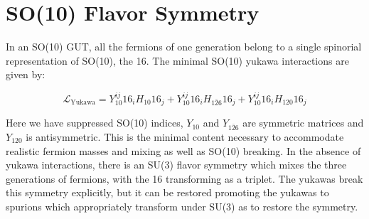 \documentclass[aps,onecolumn,twoside,secnumarabic,balancelastpage,amsmath,amssymb,nofootinbib,hyperref=pdftex]{revtex4}
\begin{document}
\title{}
\author         {Noah Steinberg}
\date{\today}

\maketitle

\section{SO(10) Flavor Symmetry}
In an SO(10) GUT, all the fermions of one generation belong to a single spinorial representation of SO(10), the 16. The minimal SO(10) yukawa interactions are given by:

\begin{equation}
\mathcal{L}_{\text{Yukawa}} = Y^{ij}_{10}16_{i}H_{10}16_{j} + Y^{ij}_{10}16_{i}H_{\bar{126}}16_{j} + Y^{ij}_{10}16_{i}H_{120}16_{j}
\end{equation}

Here we have suppressed SO(10) indices, $Y_{10}$ and $Y_{\bar{126}}$ are symmetric matrices and $Y_{120}$ is antisymmetric. This is the minimal content necessary to accommodate realistic fermion masses and mixing as well as SO(10) breaking. In the absence of yukawa interactions, there is an SU(3) flavor symmetry which mixes the three generations of fermions, with the 16 transforming as a triplet. The yukawas break this symmetry explicitly, but it can be restored promoting the yukawas to spurions which appropriately transform under SU(3) as to restore the symmetry.   
\end{document}
